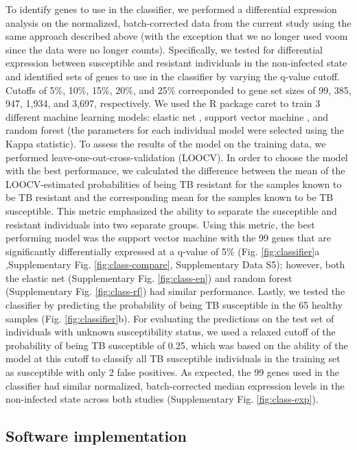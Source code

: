 \documentclass[fleqn,10pt]{wlscirep}
\begin{document}
To identify genes to use in the classifier, we performed a
differential expression analysis on the normalized, batch-corrected
data from the current study using the same approach described above
(with the exception that we no longer used voom \cite{Law2014} since
the data were no longer counts). Specifically, we tested for
differential expression between susceptible and resistant individuals
in the non-infected state and identified sets of genes to use in the
classifier by varying the q-value cutoff. Cutoffs of 5\%, 10\%, 15\%,
20\%, and 25\% corresponded to gene set sizes of 99, 385, 947, 1,934,
and 3,697, respectively. We used the R package caret \cite{Kuhn2008}
to train 3 different machine learning models: elastic net
\cite{Friedman2010}, support vector machine \cite{Karatzoglou2004},
and random forest \cite{Liaw2002} (the parameters for each individual
model were selected using the Kappa statistic). To assess the results
of the model on the training data, we performed
leave-one-out-cross-validation (LOOCV). In order to choose the model
with the best performance, we calculated the difference between the
mean of the LOOCV-estimated probabilities of being TB resistant for
the samples known to be TB resistant and the corresponding mean for
the samples known to be TB susceptible. This metric emphasized the
ability to separate the susceptible and resistant individuals into two
separate groups. Using this metric, the best performing model was the
support vector machine with the 99 genes that are significantly
differentially expressed at a q-value of 5\% (Fig.
\ref{fig:classifier}a ,Supplementary Fig. \ref{fig:class-compare},
Supplementary Data S5); however, both the elastic net (Supplementary
Fig. \ref{fig:class-en}) and random forest (Supplementary Fig.
\ref{fig:class-rf}) had similar performance. Lastly, we tested the
classifier by predicting the probability of being TB susceptible in
the 65 healthy samples (Fig. \ref{fig:classifier}b). For evaluating
the predictions on the test set of individuals with unknown
susceptibility status, we used a relaxed cutoff of the probability of
being TB susceptible of 0.25, which was based on the ability of the
model at this cutoff to classify all TB susceptible individuals in the
training set as susceptible with only 2 false positives. As expected,
the 99 genes used in the classifier had similar normalized,
batch-corrected median expression levels in the non-infected state
across both studies (Supplementary Fig. \ref{fig:class-exp}).
\subsection*{Software implementation}
\end{document}
